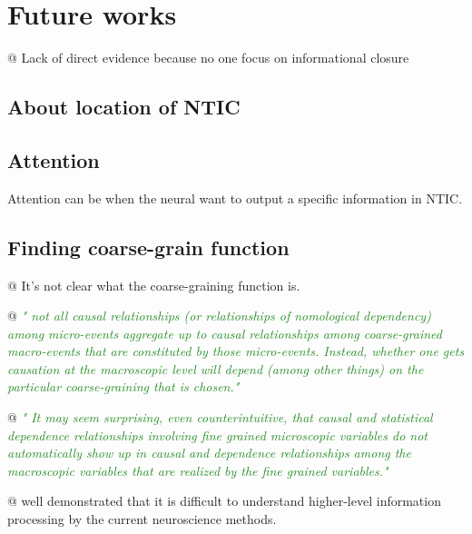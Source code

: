 \documentclass[utf8]{article}
\newenvironment{ants}
			{
			 \begin{easylist}[itemize]		
		 	}
			{
			\end{easylist}
			}
\newcommand{\rewrite}[1]{\textcolor{ForestGreen}{\textit{"#1"}}\newline}
\begin{document}
		
		

	\section{Future works}
		\begin{ants}
			
			@ Lack of direct evidence because no one focus on informational closure
			
			
		\end{ants}
	
		\subsection{About location of NTIC}
		\subsection{Attention}
			Attention can be when the neural want to output a specific information in NTIC. 
		
		



		\subsection{Finding coarse-grain function}
			\begin{ants}
				@ It's not clear what the coarse-graining function is.
				
				@ \rewrite{
					not all causal relationships (or relationships of nomological dependency) among micro-events aggregate up to causal relationships among coarse-grained macro-events that are constituted by those micro-events. Instead, whether one gets causation at the macroscopic level will depend (among other things) on the particular coarse-graining that is chosen.} \cite{price2007causation}
				
				@ \rewrite{
					It may seem surprising, even counterintuitive, that causal and statistical dependence relationships involving fine grained microscopic variables do not automatically show up in causal and dependence relationships among the macroscopic variables that are realized by the fine grained variables.} \cite{price2007causation}
				
				@ \cite{jonas2017could} well demonstrated that it is difficult to understand higher-level information processing by the current neuroscience methods. 
				
			\end{ants}
	
\end{document}
